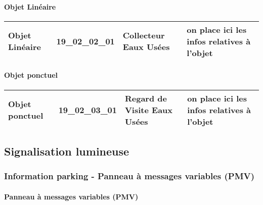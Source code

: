 \documentclass[12pt,titlepage,oneside]{book}
\begin{document}
\paragraph{Objet Linéaire}
\noindent
\vspace{\baselineskip}

\renewcommand{\arraystretch}{1.2}
\begin{supertabular}{|p{10cm}|c|p{13cm}|p{12cm}|}
 Objet Linéaire & 19\_02\_02\_01 & Collecteur Eaux Usées & on place ici les infos relatives à l'objet\\
\hline
\end{supertabular}
\begin{figure}[h!]
  \hfill         %
\end{figure}


\paragraph{Objet ponctuel}
\noindent
\vspace{\baselineskip}

\renewcommand{\arraystretch}{1.2}
\begin{supertabular}{|p{10cm}|c|p{13cm}|p{12cm}|}
 Objet ponctuel & 19\_02\_03\_01 & Regard de Visite Eaux Usées & on place ici les infos relatives à l'objet\\
\hline
\end{supertabular}
\begin{figure}[h!]
  \hfill         %
\end{figure}
\subsection{Signalisation lumineuse}
\subsubsection{\large Information parking - Panneau à messages variables (PMV)}
\paragraph{Panneau à messages variables (PMV)}
\noindent
\vspace{\baselineskip}
\end{document}
